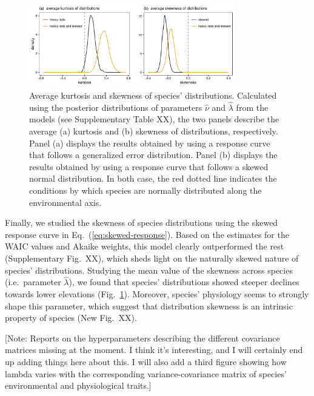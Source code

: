 \documentclass[11pt, a4paper]{article}
\begin{document}
\begin{figure}[ht]
  \centering
    \vspace{0.5cm}
    \includegraphics[width=0.8\textwidth]{figures/kurto-skew}
    	  \vspace{0.3cm}
	   \caption{Average kurtosis and skewness of species' distributions. Calculated using the posterior distributions of parameters $\hat{\nu}$ and $\hat{\lambda}$ from the models (see Supplementary Table XX), the two panels describe the average (a) kurtosis and (b) skewness of distributions, respectively. Panel (a) displays the results obtained by using a response curve that follows a generalized error distribution. Panel (b) displays the results obtained by using a response curve that follows a skewed normal distribution. In both case, the red dotted line indicates the conditions by which species are normally distributed along the environmental axis.}
      \label{fig:kurtosis-skewness}
\end{figure}

Finally, we studied the skewness of species distributions using the skewed response curve in Eq.~(\ref{eq:skewed-response}). Based on the estimates for the WAIC values and Akaike weights, this model clearly outperformed the rest (Supplementary Fig.~XX), which sheds light on the naturally skewed nature of species' distributions. Studying the mean value of the skewness across species (i.e.~parameter $\hat{\lambda}$), we found that species' distributions showed steeper declines towards lower elevations (Fig.~\ref{fig:kurtosis-skewness}). Moreover, species' physiology seems to strongly shape this parameter, which suggest that distribution skewness is an intrinsic property of species (New Fig.~XX).
 
{\color{gray}
[Note: Reports on the hyperparameters describing the different covariance matrices missing at the moment. I think it's interesting, and I will certainly end up adding things here about this. I will also add a third figure showing how lambda varies with the corresponding variance-covariance matrix of species' environmental and physiological traits.]}
\end{document}
